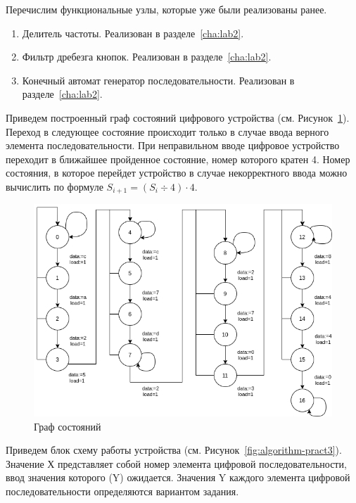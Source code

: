 Перечислим функциональные узлы, которые уже были реализованы ранее. 

\begin{enumerate}
	\item Делитель частоты. Реализован в разделе~\ref{cha:lab2}.
	\item Фильтр дребезга кнопок. Реализован в разделе~\ref{cha:lab2}.
	\item Конечный автомат генератор последовательности. Реализован в разделе~\ref{cha:lab2}.
\end{enumerate}

Приведем построенный граф состояний цифрового устройства (см. Рисунок~\ref{fig:state-graph-pract3}). Переход в следующее состояние происходит только в случае ввода верного элемента последовательности. При неправильном вводе цифровое устройство переходит в ближайшее пройденное состояние, номер которого кратен 4. Номер состояния, в которое перейдет устройство в случае некорректного ввода можно вычислить по формуле $S_{i+1}=(S_i \div 4) \cdot 4$.

\begin{figure}[h!]
	\centering
	\includegraphics[width=0.7\linewidth]{course-plis/images/lab3/state-graph-pract3}
	\caption{Граф состояний}
	\label{fig:state-graph-pract3}
\end{figure}

Приведем блок схему работы устройства (см. Рисунок~\ref{fig:algorithm-pract3}). Значение Х представляет
собой номер элемента цифровой последовательности, ввод значения которого (Y)
ожидается. Значения Y каждого элемента цифровой последовательности определяются
вариантом задания.

